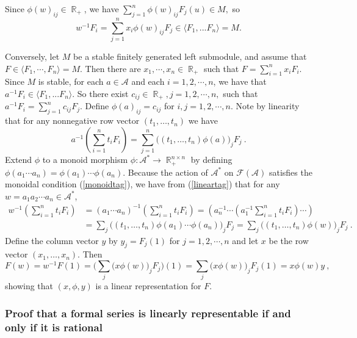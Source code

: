 \documentclass{kepart2010}
\theoremstyle{plain}
\theoremstyle{definition}
\theoremstyle{remark}
\theoremstyle{definition}
\numberwithin{equation}{section}
\begin{document}
Since $\phi(w)_{ij} \in \operatorname{\mathbb R}_{+}$, we have $\sum_{j=1}^{n}
\phi(w)_{ij}F_{j}(u) \in M,$ so
$$w^{-1}F_{i}=\sum_{j=1}^{n} x_{i}\phi(w)_{ij}F_{j}\in
\langle F_{1},...F_{n} \rangle =M.$$

Conversely, let $M$ be a stable finitely generated left submodule,
and assume that $F\in \langle F_{1},\cdots,F_{n}\rangle =M.$ Then
there are $x_1, \cdots, x_n \in \operatorname{\mathbb R}_{+}$ such that
$F=\sum_{i=1}^{n} x_{i}F_{i}$.  Since $M$ is stable, for each $a\in
{{\mathcal A}}$ and each $i=1,2,\cdots,n$, we have that $a^{-1}F_{i}\in \langle
F_{1},...F_{n} \rangle$. So there exist $c_{ij}\in \operatorname{\mathbb R}_{+},
j=1,2,\cdots, n,$ such that $a^{-1}F_{i}=\sum_{j=1}^{n}
c_{ij}F_{j}$.
 Define $\phi(a)_{ij}=c_{ij}$ for $i,j=1,2,\cdots ,n.$
Note by linearity that for any nonnegative row
vector $(t_1, \dots ,t_n)$
we have
\begin{equation} \label{lineartag}
a^{-1}(\sum_{i=1}^n t_iF_i) =
\sum_{j=1}^n\Big( (t_1, \dots , t_n)\phi(a)\Big)_j F_j \ .
\end{equation}
Extend $\phi$ to a monoid morphism $\phi: {{\mathcal A}}^{*}\rightarrow
\operatorname{\mathbb R}_{+}^{n \times n}$ by defining $\phi(a_1 \cdots a_n) = \phi(a_1)
\cdots \phi(a_n)$. Because the action of ${{\mathcal A}}^{*}$ on
$\mathcal{F}({{\mathcal A}})$ satisfies the monoidal condition
(\ref{monoidtag}), we have
from (\ref{lineartag}) that
for any  $w=a_1a_2\cdots a_n \in {{\mathcal A}}^{*}$,
\begin{align*}
w^{-1}(\sum_{i=1}^n t_iF_i) &=
(a_1\cdots a_n)^{-1}(\sum_{i=1}^n t_iF_i)
=(a_n^{-1} \cdots  (a_1^{-1}\sum_{i=1}^n t_iF_i)\cdots ) \\
&= \sum_j \Big((t_1,\dots ,t_n) \phi (a_1)\cdots \phi
(a_n)\Big)_jF_j
= \sum_j \Big((t_1,\dots ,t_n) \phi (w)\Big)_jF_j \ .
\end{align*}
 Define the column vector $y$ by
 $y_{j}=F_{j}(1)$ for $j=1,2,\cdots,n$
 and let $x$ be the row vector $(x_1, \dots ,x_n)$.
Then
\begin{equation}
F(w)= w^{-1}F(1) = \Bigg(\sum_j\Big(x\phi (w)\Big)_jF_j\Bigg)(1)
= \sum_j\Big(x\phi (w)\Big)_jF_j(1) =x\phi (w) y \ ,
\end{equation}
 showing that  $(x,\phi, y)$ is a linear representation
for $F$.

\subsubsection{Proof that a formal series is linearly representable if and only if it is
rational}\label{subsec_lr=rat}
\end{document}
